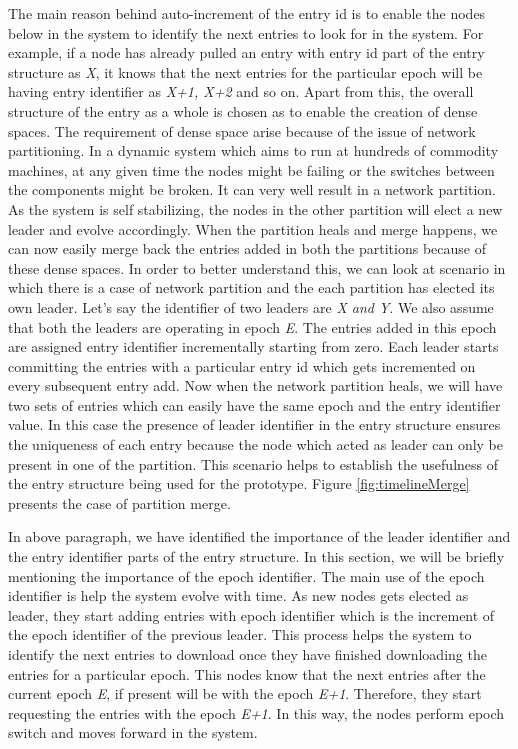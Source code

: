 \documentclass[a4paper,11pt]{kth-mag}
\begin{document}
\par The main reason behind auto-increment of the entry id is to enable the nodes below in the system to identify the next entries to look for in the system. For example, if a node has already pulled an entry with entry id part of the entry structure as \textit{X}, it knows that the next entries for the particular epoch will be having entry identifier as \textit{X+1, X+2} and so on. Apart from this, the overall structure of the entry as a whole is chosen as to enable the creation of dense spaces. The requirement of dense space arise because of the issue of network partitioning. In a dynamic system which aims to run at hundreds of commodity machines, at any given time the nodes might be failing or the switches between the components might be broken. It can very well result in a network partition. As the system is self stabilizing, the nodes in the other partition will elect a new leader and evolve accordingly. When the partition heals and merge happens, we can now easily merge back the entries added in both the partitions because of these dense spaces. In order to better understand this, we can look at scenario in which there is a case of network partition and the each partition has elected its own leader. Let's say the identifier of two leaders are \textit{X and Y}. We also assume that both the leaders are operating in epoch \textit{E}. The entries added in this epoch are assigned entry identifier  incrementally starting from zero. Each leader starts committing the entries with a particular entry id which gets incremented on every subsequent entry add. Now when the network partition heals, we will have two sets of entries which can easily have the same epoch and the entry identifier value. In this case the presence of leader identifier in the entry structure ensures the uniqueness of each entry because the node which acted as leader can only be present in one of the partition. This scenario helps to establish the usefulness of the entry structure being used for the prototype. Figure \ref{fig:timelineMerge} presents the case of partition merge.

\par In above paragraph, we have identified the importance of the leader identifier and the entry identifier parts of the entry structure. In this section, we will be briefly mentioning the importance of the epoch identifier. The main use of the epoch identifier is help the system evolve with time. As new nodes gets elected as leader, they start adding entries with epoch identifier which is the increment of the epoch identifier of the previous leader. This process helps the system to identify the next entries to download once they have finished downloading the entries for a particular epoch. This nodes know that the next entries after the current epoch \textit{E}, if present will be with the epoch \textit{E+1}. Therefore, they start requesting the entries with the epoch \textit{E+1}. In this way, the nodes perform epoch switch and moves forward in the system.
\end{document}
